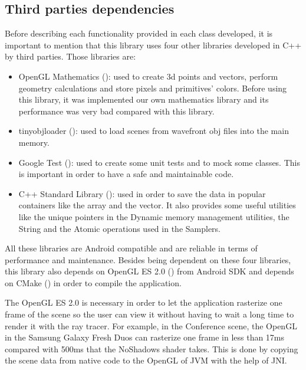 \subsection{Third parties dependencies}

\par
Before describing each functionality provided in each class developed, it is important to mention that this library uses four other libraries developed in C++ by third parties.
Those libraries are:

\begin{itemize}
	\item OpenGL Mathematics (\cite{GLM}): used to create 3d points and vectors, perform geometry calculations and store pixels and primitives' colors.
	Before using this library, it was implemented our own mathematics library and its performance was very bad compared with this library.
	\item tinyobjloader (\cite{tinyobjloader}): used to load scenes from wavefront obj files into the main memory.
	\item Google Test (\cite{GoogleTest}): used to create some unit tests and to mock some classes.
	This is important in order to have a safe and maintainable code.
	\item C++ Standard Library (\cite{C++_stdlib}): used in order to save the data in popular containers like the array and the vector.
	It also provides some useful utilities like the unique pointers in the Dynamic memory management utilities, the String and the Atomic operations used in the Samplers.
\end{itemize}

\par
All these libraries are Android compatible and are reliable in terms of performance and maintenance.
Besides being dependent on these four libraries, this library also depends on OpenGL ES 2.0 (\cite{OpenGL_ES_2}) from Android SDK and depends on CMake (\cite{CMake}) in order to compile the application.

\par
The OpenGL ES 2.0 is necessary in order to let the application rasterize one frame of the scene so the user can view it without having to wait a long time to render it with the ray tracer.
For example, in the Conference scene, the OpenGL in the Samsung Galaxy Fresh Duos can rasterize one frame in less than 17ms compared with 500ms that the NoShadows shader takes.
This is done by copying the scene data from native code to the OpenGL of JVM with the help of JNI.

